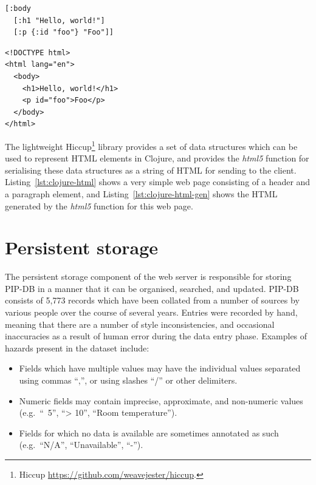 \lstset{language=clojure}
\begin{lstlisting}[label=lst:clojure-html,caption={%
      [Example Clojure representation of HTML elements]
       Example Clojure representation of HTML elements.}]
[:body
  [:h1 "Hello, world!"]
  [:p {:id "foo"} "Foo"]]
\end{lstlisting}


\lstset{language=html}
\begin{lstlisting}[label=lst:clojure-html-gen,caption={%
      [Generated HTML for the Clojure example]
       The HTML which is generated evaluation of the Clojure example.}]
<!DOCTYPE html>
<html lang="en">
  <body>
    <h1>Hello, world!</h1>
    <p id="foo">Foo</p>
  </body>
</html>
\end{lstlisting}


The lightweight Hiccup\footnote{Hiccup
  \url{https://github.com/weavejester/hiccup}.}  library provides a
set of data structures which can be used to represent HTML elements in
Clojure, and provides the \textit{html5} function for serialising
these data structures as a string of HTML for sending to the client.
Listing~\ref{lst:clojure-html} shows a very simple web page consisting
of a header and a paragraph element, and
Listing~\ref{lst:clojure-html-gen} shows the HTML generated by the
\textit{html5} function for this web page.

\section{Persistent storage}\label{sec:persistent-storage}

The persistent storage component of the web server is responsible for
storing PIP-DB in a manner that it can be organised, searched, and
updated. PIP-DB consists of 5,773 records which have been collated
from a number of sources by various people over the course of several
years. Entries were recorded by hand, meaning that there are a number
of style inconsistencies, and occasional inaccuracies as a result of
human error during the data entry phase. Examples of hazards present
in the dataset include:

\begin{itemize}
\item Fields which have multiple values may have the individual values
  separated using commas ``,'', or using slashes ``/'' or other
  delimiters.
\item Numeric fields may contain imprecise, approximate, and
  non-numeric values (e.g.\ ``~5'', ``> 10'', ``Room temperature'').
\item Fields for which no data is available are sometimes annotated as
  such (e.g.\ ``N/A'', ``Unavailable'', ``-'').
\end{itemize}

